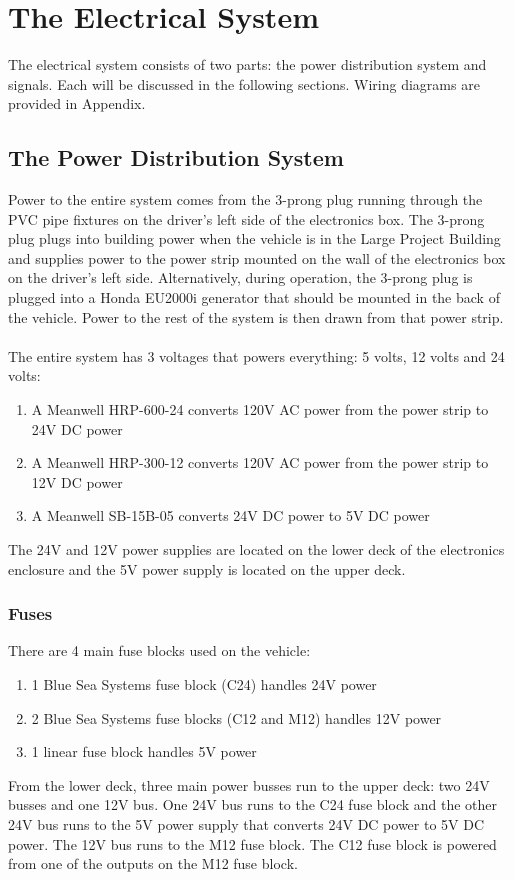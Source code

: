 \section{The Electrical System}

The electrical system consists of two parts: the power distribution system and signals. Each will be discussed in the following sections. Wiring diagrams are provided in Appendix.

\subsection{The Power Distribution System}

Power to the entire system comes from the 3-prong plug running through the PVC pipe fixtures on the driver's left side of the electronics box. The 3-prong plug plugs into building power when the vehicle is in the Large Project Building and supplies power to the power strip mounted on the wall of the electronics box on the driver's left side. Alternatively, during operation, the 3-prong plug is plugged into a Honda EU2000i generator that should be mounted in the back of the vehicle. Power to the rest of the system is then drawn from that power strip. \\ \\
%
The entire system has 3 voltages that powers everything: 5 volts, 12 volts and 24 volts:
\begin{enumerate}
\item A Meanwell HRP-600-24 converts 120V AC power from the power strip to 24V DC power
\item A Meanwell HRP-300-12 converts 120V AC power from the power strip to 12V DC power
\item A Meanwell SB-15B-05 converts 24V DC power to 5V DC power
\end{enumerate}
%
The 24V and 12V power supplies are located on the lower deck of the electronics enclosure and the 5V power supply is located on the upper deck.
%
\subsubsection{Fuses}
There are 4 main fuse blocks used on the vehicle:
\begin{enumerate}
\item 1 Blue Sea Systems fuse block (C24) handles 24V power
\item 2 Blue Sea Systems fuse blocks (C12 and M12) handles 12V power
\item 1 linear fuse block handles 5V power 
\end{enumerate}
%
From the lower deck, three main power busses run to the upper deck: two 24V busses and one 12V bus. One 24V bus runs to the C24 fuse block and the other 24V bus runs to the 5V power supply that converts 24V DC power to 5V DC power. The 12V bus runs to the M12 fuse block. The C12 fuse block is powered from one of the outputs on the M12 fuse block.
%
